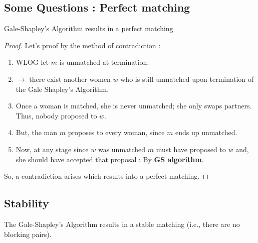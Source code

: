 \subsection{Some Questions : Perfect matching}

\begin{theorem}\label{thm_1_3}
    Gale-Shapley's Algorithm results in a perfect matching
\end{theorem}

\begin{proof}
    Let's proof by the method of contradiction : 
\begin{enumerate}
    \item WLOG let $m$ is unmatched at termination.
    \item $\longrightarrow$ there exist another women $w$ who is still unmatched upon termination of the Gale Shapley's Algorithm.
    \item Once a woman is matched, she is never unmatched; she only swaps partners. Thus, nobody proposed to $w$.
    \item But, the man $m$ proposes to every woman, since $m$ ends up unmatched.
    \item Now, at any stage since $w$ was unmatched $m$ must have proposed to $w$ and, she should have accepted that proposal : By \textbf{GS algorithm}.
\end{enumerate}
So, a contradiction arises which results into a perfect matching.
\end{proof}

\subsection{Stability}

\begin{theorem}\label{thm_1_4}
    The Gale-Shapley's Algorithm results in a stable matching (i.e., there are no blocking pairs).
\end{theorem}

